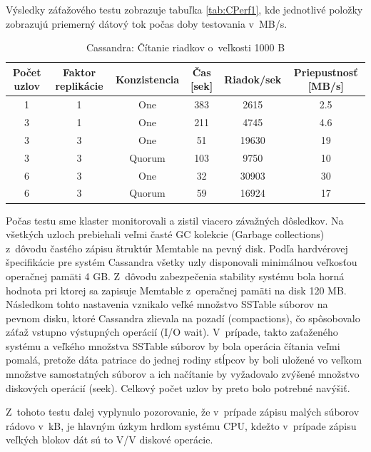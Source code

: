 \documentclass[11pt,twoside,a4paper]{book}
\begin{document}
Výsledky záťažového testu zobrazuje tabuľka \ref{tab:CPerf1}, kde jednotlivé položky zobrazujú priemerný dátový tok počas doby testovania v~MB/s.
\begin{table}[hp]
\begin{center}
\begin{tabular}{|c|c|c|c|c|c|}
\hline Počet uzlov & Faktor replikácie & Konzistencia & Čas [sek] & Riadok/sek & Priepustnosť [MB/s]\\ 
\hline
\hline 1 & 1 & One & 383 & 2615 & 2.5\\ 
\hline 3 & 1 & One & 211 & 4745 & 4.6\\ 
\hline 3 & 3 & One & 51 & 19630 & 19\\ 
\hline 3 & 3 & Quorum & 103 & 9750 & 10\\ 
\hline 6 & 3 & One & 32 & 30903 & 30\\ 
\hline 6 & 3 & Quorum & 59 & 16924 & 17\\ 
\hline
\end{tabular} 
\end{center}
\caption{Cassandra: Čítanie riadkov o~veľkosti 1000 B}
\label{tab:CPerf3}
\end{table}
Počas testu sme klaster monitorovali a zistil viacero závažných dôsledkov. Na všetkých uzloch prebiehali veľmi časté GC kolekcie (Garbage collections) z~dôvodu častého zápisu štruktúr Memtable na pevný disk. Podľa hardvérovej špecifikácie pre systém Cassandra všetky uzly disponovali minimálnou veľkosťou operačnej pamäti 4 GB. Z~dôvodu zabezpečenia stability systému bola horná hodnota pri ktorej sa zapisuje Memtable z~operačnej pamäti na disk 120 MB. Následkom tohto nastavenia vznikalo veľké množstvo SSTable súborov na pevnom disku, ktoré Cassandra zlievala na pozadí (compactions), čo spôsobovalo záťaž vstupno výstupných operácií (I/O wait). V~prípade, takto zaťaženého systému a veľkého množstva SSTable súborov by bola operácia čítania veľmi pomalá, pretože dáta patriace do jednej rodiny stĺpcov by boli uložené vo veľkom množstve samostatných súborov a ich načítanie by vyžadovalo zvýšené množstvo diskových operácií (seek). Celkový počet uzlov by preto bolo potrebné navýšiť.

Z~tohoto testu ďalej vyplynulo pozorovanie, že v~prípade zápisu malých súborov rádovo v~kB, je hlavným úzkym hrdlom systému CPU, kdežto v~prípade zápisu veľkých blokov dát sú to V/V diskové operácie.
\end{document}
